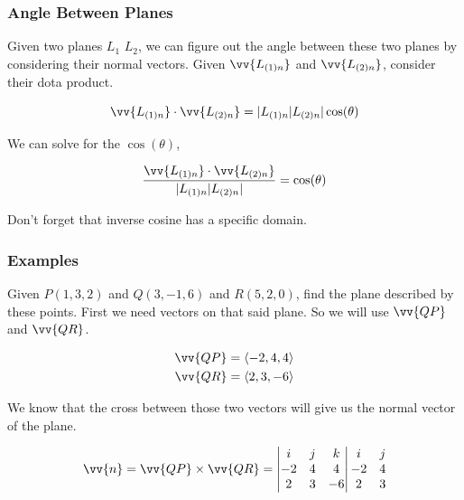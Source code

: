 \subsubsection{Angle Between Planes}
Given two planes $L_1$ $L_2$, we can figure out the angle between these two planes by considering their normal vectors. Given 
$\vv{L_{(1)n}}$ and $\vv{L_{(2)n}}$, consider their dota product. 

\begin{equation*}
\vv{L_{(1)n}} \cdot \vv{L_{(2)n}} = |L_{(1)n}|L_{(2)n}|\cos(\theta)
\end{equation*}

We can solve for the $\cos(\theta)$, 

\begin{equation*}
	\frac{\vv{L_{(1)n}} \cdot \vv{L_{(2)n}}}{|L_{(1)n}|L_{(2)n}|} = \cos(\theta)
\end{equation*}

Don't forget that inverse cosine has a specific domain.

\subsubsection{Examples}
Given $P(1,3,2)$ and $Q(3,-1,6)$ and $R(5,2,0)$, find the plane described by these points. First we need vectors on that said plane. So we will use $\vv{QP}$ and $\vv{QR}$. 

\begin{align*}
	\vv{QP} &= \langle -2,4,4 \rangle  \\ 
	\vv{QR} &= \langle 2,3,-6 \rangle 
\end{align*}

We know that the cross between those two vectors will give us the normal vector of the plane. 

\begin{equation*}
	\vv{n} = \vv{QP} \times \vv{QR} = \begin{vmatrix}
		i & j & k \\ 
		-2 & 4 & 4 \\  
		2 &3 & -6  \\ 
	\end{vmatrix} \begin{matrix}
		i & j \\ 
		-2 & 4 \\ 
		2 & 3 \\ 
	\end{matrix}
\end{equation*}

